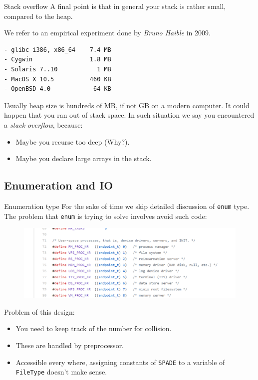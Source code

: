 \begin{frame}[fragile]{Stack overflow}
A final point is that in general your stack is rather small, compared to the heap.

We refer to an empirical experiment done by \textit{Bruno Haible} in 2009.

\begin{verbatim}
- glibc i386, x86_64    7.4 MB
- Cygwin                1.8 MB
- Solaris 7..10           1 MB
- MacOS X 10.5          460 KB
- OpenBSD 4.0            64 KB
\end{verbatim}

Usually heap size is hundreds of MB, if not GB on a modern computer. It could happen that you ran out of stack space. In such situation we say you encountered a \textit{stack overflow}, because: 
\begin{itemize}
	\item Maybe you recurse too deep (Why?). 
	\item Maybe you declare large arrays in the stack.
\end{itemize}
\end{frame}

\subsection{Enumeration and IO}

\begin{frame}{Enumeration type}
For the sake of time we skip detailed discussion of \texttt{enum} type. The problem that \texttt{enum} is trying to solve involves avoid such code:
\begin{figure}
	\centering
	\includegraphics[scale=0.25]{fig/rc5_const}
\end{figure}
Problem of this design:
\begin{itemize}
	\item You need to keep track of the number for collision.
	\item These are handled by preprocessor.
	\item Accessible every where, assigning constants of \texttt{SPADE} to a variable of \texttt{FileType} doesn't make sense. 
\end{itemize}
\end{frame}

